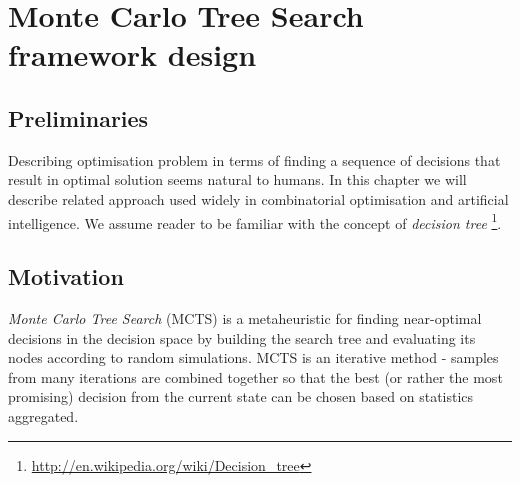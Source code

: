 \chapter{Monte Carlo Tree Search framework design}

\section{Preliminaries}
Describing optimisation problem in terms of finding a sequence of decisions
that result in optimal solution seems natural to humans. In this chapter we
will describe related approach used widely in combinatorial optimisation and
artificial intelligence. We assume reader to be familiar with the concept of
\emph{decision tree}
\footnote{\url{http://en.wikipedia.org/wiki/Decision_tree}}.

\section{Motivation}
\emph{Monte Carlo Tree Search} (MCTS) is a metaheuristic for finding
near-optimal decisions in the decision space by building the search tree and
evaluating its nodes according to random simulations.
MCTS is an iterative method - samples from many iterations are combined together
so that the best (or rather the most promising) decision from the current state
can be chosen based on statistics aggregated.

